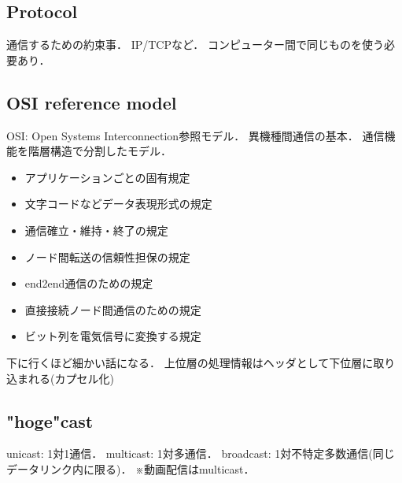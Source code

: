 \subsection{Protocol}
通信するための約束事．
IP/TCPなど．
コンピューター間で同じものを使う必要あり．

\subsection{OSI reference model}
OSI: Open Systems Interconnection参照モデル．
異機種間通信の基本．
通信機能を階層構造で分割したモデル．
\begin{itemize}
    \item アプリケーションごとの固有規定
    \item 文字コードなどデータ表現形式の規定
    \item 通信確立・維持・終了の規定
    \item ノード間転送の信頼性担保の規定
    \item end2end通信のための規定
    \item 直接接続ノード間通信のための規定
    \item ビット列を電気信号に変換する規定
\end{itemize}
下に行くほど細かい話になる．
上位層の処理情報はヘッダとして下位層に取り込まれる(カプセル化)

\subsection{"hoge"cast}
unicast: 1対1通信．
multicast: 1対多通信．
broadcast: 1対不特定多数通信(同じデータリンク内に限る)．
※動画配信はmulticast．

